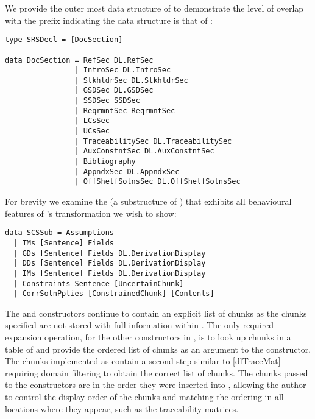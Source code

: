 We provide the outer most data structure of  to demonstrate the level of overlap with the  prefix indicating the data structure is that of :

\begin{tcolorbox}
\begin{verbatim}
type SRSDecl = [DocSection]

data DocSection = RefSec DL.RefSec
                | IntroSec DL.IntroSec
                | StkhldrSec DL.StkhldrSec
                | GSDSec DL.GSDSec
                | SSDSec SSDSec
                | ReqrmntSec ReqrmntSec
                | LCsSec
                | UCsSec
                | TraceabilitySec DL.TraceabilitySec
                | AuxConstntSec DL.AuxConstntSec
                | Bibliography
                | AppndxSec DL.AppndxSec
                | OffShelfSolnsSec DL.OffShelfSolnsSec
\end{verbatim}
\end{tcolorbox}

For brevity we examine the   (a substructure of ) that exhibits all behavioural features of 's transformation we wish to show:

\begin{tcolorbox}
\begin{verbatim}
data SCSSub = Assumptions
  | TMs [Sentence] Fields
  | GDs [Sentence] Fields DL.DerivationDisplay
  | DDs [Sentence] Fields DL.DerivationDisplay
  | IMs [Sentence] Fields DL.DerivationDisplay
  | Constraints Sentence [UncertainChunk]
  | CorrSolnPpties [ConstrainedChunk] [Contents]
\end{verbatim}
\end{tcolorbox}

The  and  constructors continue to contain an explicit list of chunks as the chunks specified are not stored with full information within . The only required expansion operation, for the other constructors in , is to look up chunks in a table of  and provide the ordered list of chunks as an argument to the  constructor. The chunks implemented as  contain a second step similar to \autoref{dlTraceMat} requiring domain filtering to obtain the correct list of chunks. The chunks passed to the  constructors are in the order they were inserted into , allowing the author to control the display order of the chunks and matching the ordering in all locations where they appear, such as the traceability matrices.


